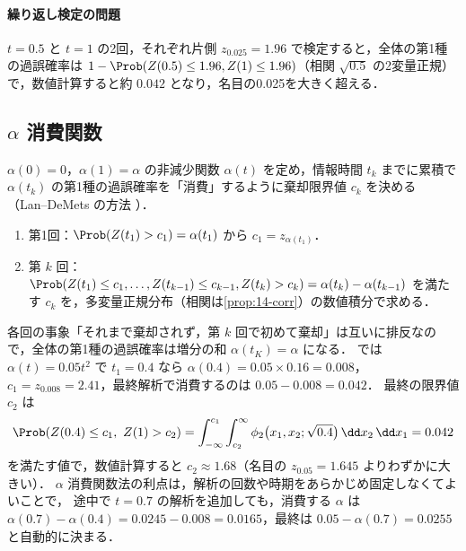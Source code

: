 \paragraph{繰り返し検定の問題}
$t=0.5$ と $t=1$ の2回，それぞれ片側 $z_{0.025}=1.96$ で検定すると，全体の第1種の過誤確率は
$1-\Prob(Z(0.5)\le1.96,Z(1)\le1.96)$（相関 $\sqrt{0.5}$ の2変量正規）で，数値計算すると約 $0.042$ となり，名目の0.025を大きく超える．

\subsection{\texorpdfstring{$\alpha$}{α} 消費関数}\label{subsec:14-spending}
\begin{teigi}\label{def:14-spending}
$\alpha(0)=0$，$\alpha(1)=\alpha$ の非減少関数 $\alpha(t)$ を定め，情報時間 $t_k$ までに累積で $\alpha(t_k)$ の第1種の過誤確率を「消費」するように棄却限界値 $c_k$ を決める
（Lan--DeMets の方法 \cite{landemets1983}）．
\end{teigi}
\begin{enumerate}
\item 第1回：$\Prob(Z(t_1)>c_1)=\alpha(t_1)$ から $c_1=z_{\alpha(t_1)}$．
\item 第 $k$ 回：$\Prob(Z(t_1)\le c_1,\dots,Z(t_{k-1})\le c_{k-1},Z(t_k)>c_k)=\alpha(t_k)-\alpha(t_{k-1})$ を満たす $c_k$ を，多変量正規分布（相関は\cref{prop:14-corr}）の数値積分で求める．
\end{enumerate}
各回の事象「それまで棄却されず，第 $k$ 回で初めて棄却」は互いに排反なので，全体の第1種の過誤確率は増分の和 $\alpha(t_K)=\alpha$ になる．
 では $\alpha(t)=0.05t^2$ で $t_1=0.4$ なら $\alpha(0.4)=0.05\times0.16=0.008$，$c_1=z_{0.008}=2.41$，最終解析で消費するのは $0.05-0.008=0.042$．
最終の限界値 $c_2$ は
\[
\Prob(Z(0.4)\le c_1,\ Z(1)>c_2)=\int_{-\infty}^{c_1}\int_{c_2}^{\infty}\phi_2\bigl(x_1,x_2;\sqrt{0.4}\bigr)\,\dd x_2\,\dd x_1=0.042
\]
を満たす値で，数値計算すると $c_2\approx1.68$（名目の $z_{0.05}=1.645$ よりわずかに大きい）．
$\alpha$ 消費関数法の利点は，解析の回数や時期をあらかじめ固定しなくてよいことで，
途中で $t=0.7$ の解析を追加しても，消費する $\alpha$ は $\alpha(0.7)-\alpha(0.4)=0.0245-0.008=0.0165$，最終は $0.05-\alpha(0.7)=0.0255$ と自動的に決まる．

